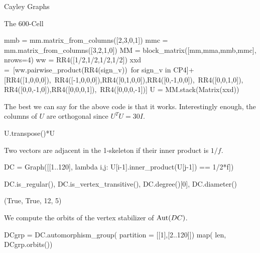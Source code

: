 \begin{chap}{Cayley Graphs}
\begin{sect}{The 600-Cell}
\begin{sagecode}
\begin{sageinput}
mmb = mm.matrix_from_columns([2,3,0,1])
mmc = mm.matrix_from_columns([3,2,1,0])
MM = block_matrix([mm,mma,mmb,mmc], nrows=4)
ww = RR4([1/2,1/2,1/2,1/2])
xxd =\ 
    [ww.pairwise_product(RR4(sign_v))\
    for sign_v in CP4]+[RR4([1,0,0,0]),\  
    RR4([-1,0,0,0]),RR4([0,1,0,0]),RR4([0,-1,0,0]),\ 
    RR4([0,0,1,0]), RR4([0,0,-1,0]),RR4([0,0,0,1]),\
    RR4([0,0,0,-1])]
U = MM.stack(Matrix(xxd))
\end{sageinput}
\end{sagecode}
%
\begin{para}
The best we can say for the above code is that it works. Interestingly
enough, the columns of $U$ are orthogonal since $U^TU =30I$.
\end{para}
%
\begin{sagecode}
\begin{sageinput}
U.transpose()*U
\end{sageinput}
\begin{sageoutput}
[30  0  0  0]
[ 0 30  0  0]
[ 0  0 30  0]
[ 0  0  0 30]
\end{sageoutput}
\end{sagecode}
%
\begin{para}
Two vectors are adjacent in the 1-skeleton if their inner product is $1/f$.
\end{para}
%
\begin{sagecode}
\begin{sageinput}
DC = Graph([[1..120], lambda i,j: U[i-1].inner_product(U[j-1]) == 1/2*f])
\end{sageinput}
\end{sagecode}
%
\begin{sagecode}
\begin{sageinput}
DC.is_regular(), DC.is_vertex_transitive(), DC.degree()[0], DC.diameter()
\end{sageinput}
\begin{sageoutput}
(True, True, 12, 5)
\end{sageoutput}
\end{sagecode}
%
\begin{para}
We compute the orbits of the vertex stabilizer of $\mathrm{Aut}(DC)$.
\end{para}
%
\begin{sagecode}
\begin{sageinput}
DCgrp = DC.automorphism_group( partition = [[1],[2..120]])
map( len, DCgrp.orbits())
\end{sageinput}
\begin{sageoutput}
[12, 12, 20, 20, 12, 12, 1, 30, 1]

\end{sageoutput}
\end{sagecode}
\end{sect}
\end{chap}
